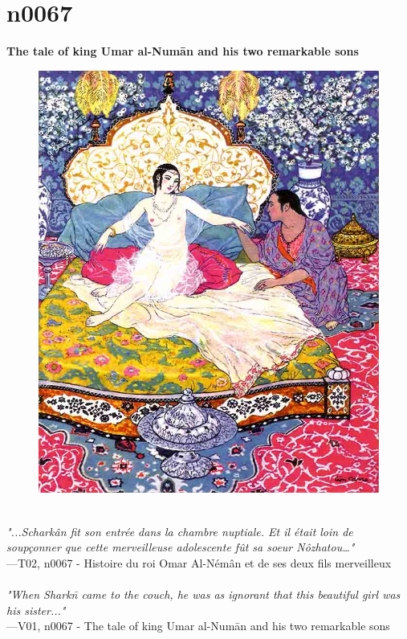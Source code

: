 \documentclass[../Carre_nights.tex]{subfiles}
\begin{document}
\newpage

\section{n0067}
\textbf{\Large{The tale of king Umar al-Num\=an and his two remarkable sons}} \\

\begin{figure}[ht]
\centering
\includegraphics[height=\figsize]{illustrations/volume_2/T02, n0067 - Histoire du roi Omar Al-Némân et de ses deux fils merveilleux.jpg}
\end{figure}

\textit{\\
"...Scharkân fit son entrée dans la chambre nuptiale. Et il était loin de soupçonner que cette merveilleuse adolescente fût sa soeur Nôzhatou…"} \\
—T02, n0067 - Histoire du roi Omar Al-Némân et de ses deux fils merveilleux \\~\\
\textit{"When Shark\=n came to the couch, he was as ignorant that this beautiful girl was his sister..."} \\
—V01, n0067 - The tale of king Umar al-Num\=an and his two remarkable sons
\end{document}

